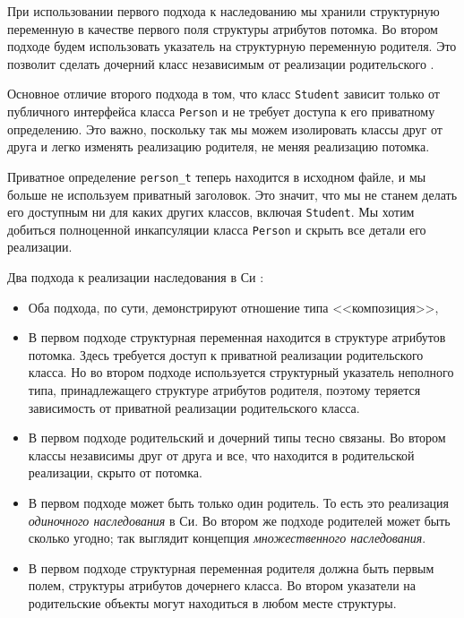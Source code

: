 \documentclass[%
	11pt,
	a4paper,
	utf8,
		]{article}
\begin{document}
При использовании первого подхода к наследованию мы хранили структурную переменную в качестве первого поля структуры атрибутов потомка. Во втором подходе будем использовать указатель на структурную переменную родителя. Это позволит сделать дочерний класс независимым от реализации родительского \cite[]{amini-extreme-c:2022}.

Основное отличие второго подхода в том, что класс \verb|Student| зависит только от публичного интерфейса класса \verb|Person| и не требует доступа к его приватному определению. Это важно, поскольку так мы можем изолировать классы друг от друга и легко изменять реализацию родителя, не меняя реализацию потомка.

Приватное определение \verb|person_t| теперь находится в исходном файле, и мы больше не используем приватный заголовок. Это значит, что мы не станем делать его доступным ни для каких других классов, включая \verb|Student|. Мы хотим добиться полноценной инкапсуляции класса \verb|Person| и скрыть все детали его реализации.

Два подхода к реализации наследования в Си \cite[]{amini-extreme-c:2022}:
\begin{itemize}
	\item Оба подхода, по сути, демонстрируют отношение типа <<композиция>>,
	
	\item В первом подходе структурная переменная находится в структуре атрибутов потомка. Здесь требуется доступ к приватной реализации родительского класса. Но во втором подходе используется структурный указатель неполного типа, принадлежащего структуре атрибутов родителя, поэтому теряется зависимость от приватной реализации родительского класса.
	
	\item В первом подходе родительский и дочерний типы тесно связаны. Во втором классы независимы друг от друга и все, что находится в родительской реализации, скрыто от потомка.
	
	\item В первом подходе может быть только один родитель. То есть это реализация \emph{одиночного наследования} в Си. Во втором же подходе родителей может быть сколько угодно; так выглядит концепция \emph{множественного наследования}.
	
	\item В первом подходе структурная переменная родителя должна быть первым полем, структуры атрибутов дочернего класса. Во втором указатели на родительские объекты могут находиться в любом месте структуры.
\end{itemize}
\end{document}
